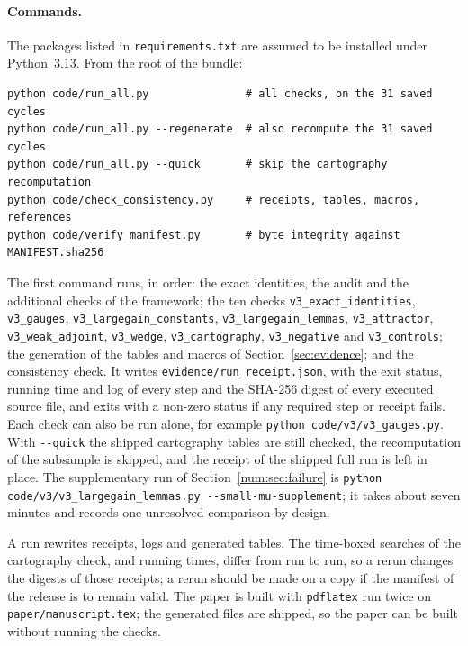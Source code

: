 \paragraph{Commands.}
The packages listed in \texttt{requirements.txt} are assumed to be installed under Python~3.13. From the root of the bundle:
\begin{verbatim}
python code/run_all.py               # all checks, on the 31 saved cycles
python code/run_all.py --regenerate  # also recompute the 31 saved cycles
python code/run_all.py --quick       # skip the cartography recomputation
python code/check_consistency.py     # receipts, tables, macros, references
python code/verify_manifest.py       # byte integrity against MANIFEST.sha256
\end{verbatim}
\begin{sloppypar}\noindent The first command runs, in order: the exact identities, the audit and the additional checks of the framework; the ten checks \texttt{v3\_exact\_identities}, \texttt{v3\_gauges}, \texttt{v3\_largegain\_constants}, \texttt{v3\_largegain\_lemmas}, \texttt{v3\_attractor}, \texttt{v3\_weak\_adjoint}, \texttt{v3\_wedge}, \texttt{v3\_cartography}, \texttt{v3\_negative} and \texttt{v3\_controls}; the generation of the tables and macros of Section~\ref{sec:evidence}; and the consistency check. It writes \texttt{evidence/run\_receipt.json}, with the exit status, running time and log of every step and the SHA-256 digest of every executed source file, and exits with a non-zero status if any required step or receipt fails. Each check can also be run alone, for example \texttt{python code/v3/v3\_gauges.py}. With \texttt{-{}-quick} the shipped cartography tables are still checked, the recomputation of the subsample is skipped, and the receipt of the shipped full run is left in place. The supplementary run of Section~\ref{num:sec:failure} is \texttt{python code/v3/v3\_largegain\_lemmas.py -{}-small-mu-supplement}; it takes about seven minutes and records one unresolved comparison by design.\end{sloppypar}

A run rewrites receipts, logs and generated tables. The time-boxed searches of the cartography check, and running times, differ from run to run, so a rerun changes the digests of those receipts; a rerun should be made on a copy if the manifest of the release is to remain valid. The paper is built with \texttt{pdflatex} run twice on \texttt{paper/manuscript.tex}; the generated files are shipped, so the paper can be built without running the checks.

